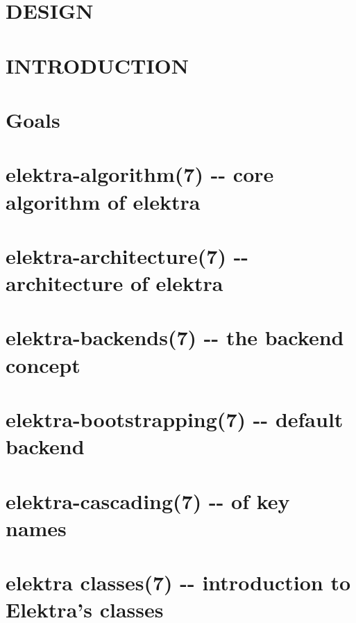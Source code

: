 \documentclass[twoside]{book}
\newcommand{\+}{\discretionary{\mbox{\scriptsize$\hookleftarrow$}}{}{}}
\begin{document}
\chapter{D\+E\+S\+I\+G\+N}
\label{doc_DESIGN_md}
\hypertarget{doc_DESIGN_md}{}

\chapter{I\+N\+T\+R\+O\+D\+U\+C\+T\+I\+O\+N}
\label{doc_GIT_md}
\hypertarget{doc_GIT_md}{}

\chapter{Goals}
\label{doc_GOALS_md}
\hypertarget{doc_GOALS_md}{}

\chapter{elektra-\/algorithm(7) -\/-\/ core algorithm of elektra}
\label{md_doc_help_elektra-algorithm}
\hypertarget{md_doc_help_elektra-algorithm}{}

\chapter{elektra-\/architecture(7) -\/-\/ architecture of elektra}
\label{md_doc_help_elektra-architecture}
\hypertarget{md_doc_help_elektra-architecture}{}

\chapter{elektra-\/backends(7) -\/-\/ the backend concept}
\label{md_doc_help_elektra-backends}
\hypertarget{md_doc_help_elektra-backends}{}

\chapter{elektra-\/bootstrapping(7) -\/-\/ default backend}
\label{md_doc_help_elektra-bootstrapping}
\hypertarget{md_doc_help_elektra-bootstrapping}{}

\chapter{elektra-\/cascading(7) -\/-\/ of key names}
\label{md_doc_help_elektra-cascading}
\hypertarget{md_doc_help_elektra-cascading}{}

\chapter{elektra classes(7) -\/-\/ introduction to Elektra's classes}
\label{md_doc_help_elektra-classes}
\hypertarget{md_doc_help_elektra-classes}{}

\end{document}
